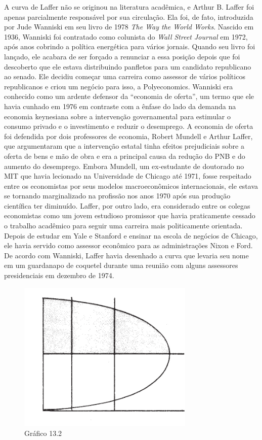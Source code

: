 \documentclass[a4paper,12pt]{article}[abntex2]
\begin{document}
A curva de Laffer não se originou na literatura acadêmica, e Arthur B. Laffer foi apenas parcialmente responsável por sua circulação. Ela foi, de fato, introduzida por Jude Wanniski em seu livro de 1978 \textit{The Way the World Works}. Nascido em 1936, Wanniski foi contratado como colunista do \textit{Wall Street Journal} em 1972, após anos cobrindo a política energética para vários jornais. Quando seu livro foi lançado, ele acabara de ser forçado a renunciar a essa posição depois que foi descoberto que ele estava distribuindo panfletos para um candidato republicano ao senado. Ele decidiu começar uma carreira como assessor de vários políticos republicanos e criou um negócio para isso, a Polyeconomics. Wanniski era conhecido como um ardente defensor da ``economia de oferta'', um termo que ele havia cunhado em 1976 em contraste com a ênfase do lado da demanda na economia keynesiana sobre a intervenção governamental para estimular o consumo privado e o investimento e reduzir o desemprego. A economia de oferta foi defendida por dois professores de economia, Robert Mundell e Arthur Laffer, que argumentaram que a intervenção estatal tinha efeitos prejudiciais sobre a oferta de bens e mão de obra e era a principal causa da redução do PNB e do aumento do desemprego. Embora Mundell, um ex-estudante de doutorado no MIT que havia lecionado na Universidade de Chicago até 1971, fosse respeitado entre os economistas por seus modelos macroeconômicos internacionais, ele estava se tornando marginalizado na profissão nos anos 1970 após sua produção científica ter diminuído. Laffer, por outro lado, era considerado entre os colegas economistas como um jovem estudioso promissor que havia praticamente cessado o trabalho acadêmico para seguir uma carreira mais politicamente orientada. Depois de estudar em Yale e Stanford e ensinar na escola de negócios de Chicago, ele havia servido como assessor econômico para as administrações Nixon e Ford. De acordo com Wanniski, Laffer havia desenhado a curva que levaria seu nome em um guardanapo de coquetel durante uma reunião com alguns assessores presidenciais em dezembro de 1974.


\begin{figure}[H]
    \centering
    \caption{Gráfico 13.2}
    \includegraphics[width=0.75\textwidth]{4º Período/História do Pensamento Econômico/Tradução HPE/Tradução Tópico 9.3/figura 2.png}
    \end{figure}
\end{document}
